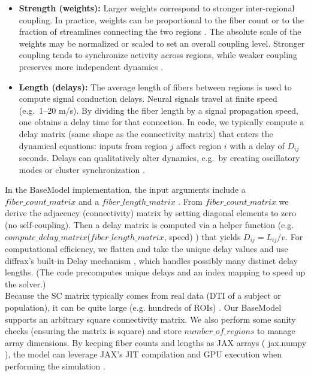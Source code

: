 \documentclass[11pt,a4paper]{article}
\begin{document}
\begin{itemize}

\item \textbf{Strength (weights):} 
Larger weights correspond to stronger inter-regional coupling. In practice, 
weights can be proportional to the fiber count or to the fraction of streamlines 
connecting the two regions \cite{jimenezmarin2024open}. The absolute scale of the weights may be normalized 
or scaled to set an overall coupling level. Stronger coupling tends to 
synchronize activity across regions, while weaker coupling preserves more 
independent dynamics \cite{honey2007network}.

\item \textbf{Length (delays):} 
The average length of fibers between regions is used to compute signal 
conduction delays. Neural signals travel at finite speed (e.g.\ 1--20 m/s). 
By dividing the fiber length by a signal propagation speed, one obtains a delay 
time for that connection. In code, we typically compute a delay matrix (same 
shape as the connectivity matrix) that enters the dynamical equations: inputs 
from region $j$ affect region $i$ with a delay of $D_{ij}$ seconds. Delays can 
qualitatively alter dynamics, e.g.\ by creating oscillatory modes or cluster 
synchronization \cite{deco2009key}.

\end{itemize}

In the BaseModel implementation, the input arguments include a $fiber\_count\_matrix$ and a
$fiber\_length\_matrix$ . From $fiber\_count\_matrix$ we derive the adjacency (connectivity) matrix by
setting diagonal elements to zero (no self-coupling). Then a delay matrix is computed via a helper function
(e.g. $compute\_delay\_matrix$($fiber\_length\_matrix$, speed) ) that yields $D_{ij}=L_{ij}/v$. For
computational efficiency, we flatten and take the unique delay values and use diffrax’s built-in Delay
mechanism \cite{kidger2021neural}, which handles possibly many distinct delay lengths. (The code precomputes unique delays and
an index mapping to speed up the solver.)\\

Because the SC matrix typically comes from real data (DTI of a subject or population), it can be quite large
(e.g. hundreds of ROIs) \cite{jimenezmarin2024open}. Our BaseModel supports an arbitrary square connectivity matrix. We also perform
some sanity checks (ensuring the matrix is square) and store $number\_of\_regions$ to manage array
dimensions. By keeping fiber counts and lengths as JAX arrays ( jax.numpy ), the model can leverage JAX’s
JIT compilation and GPU execution when performing the simulation \cite{kidger2021equinox}.
\end{document}

